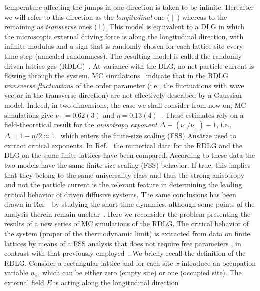 \documentclass[aps,prl,twocolumn,floatfix,amssymb,showpacs]{revtex4}
\newcommand{\pe}[1]{#1_{\bot}}
\newcommand{\pa}[1]{#1_{\|}}
\begin{document}
  temperature affecting the jumps in one direction 
  is taken to be infinite.
  Hereafter we will refer to this direction as the {\it longitudinal}
  one ($\|$) whereas to the remaining as {\it transverse}
  ones ($\bot$).
  This model is equivalent to a DLG in which the
  microscopic external driving force is along the longitudinal
  direction, with infinite modulus and 
  a sign that is randomly
  chosen for each lattice site every time step (annealed randomness). 
  The resulting model is called the randomly driven lattice gas
  (RDLG)~\cite{RDLG}. At variance with the DLG, no net particle
  current is flowing through the system.
  MC simulations~\cite{two-reservoirs} indicate that in the RDLG
  {\it transverse fluctuations} of the order parameter 
  (i.e., the fluctuations with
  wave vector in the transverse direction) are not
  effectively described by a Gaussian model.
  Indeed, in two dimensions, the case we shall consider from now on, 
  MC simulations give $\pe{\nu} = 0.62(3)$ and  $\eta =
  0.13(4)$~\cite{two-reservoirs}. These estimates rely on a
  field-theoretical result for the {\it anisotropy exponent} 
  $\Delta \equiv (\pa{\nu}/\pe{\nu}) - 1$, i.e., 
  $\Delta = 1-\eta/2 \approx 1$~\cite{RDLG} which enters the
  finite-size scaling (FSS) Ans\"atze used to extract critical exponents.
  In Ref.~\cite{Achahbar} the numerical data for the RDLG and the DLG
  on the same finite lattices have been compared. According to these
  data the two models have the same finite-size scaling (FSS) behavior.
  If true, this implies that they belong to the same 
  universality class and thus the
  strong anisotropy and not the particle current is
  the relevant feature in determining the leading critical behavior of driven
  diffusive systems. The same conclusions has been drawn 
  in Ref.~\cite{Albano} by studying the short-time dynamics,
  although some points of the analysis therein remain unclear~\cite{comment}.
  Here we reconsider the problem presenting the results of 
  a new series of MC simulations of the RDLG. The critical
  behavior  of the system (proper of the thermodynamic limit) 
  is extracted from data on finite lattices by means of a FSS analysis that 
  does not require free parameters \cite{Caracciolo},
  in contrast with that previously employed~\cite{Leung92}. 
  We briefly recall the definition of the RDLG.
  Consider a rectangular lattice and for each site $x$ introduce an occupation 
  variable $n_{x}$, which can be either zero (empty site) 
  or one (occupied site). The external field 
  $E$ is acting along the longitudinal direction 
\end{document}
